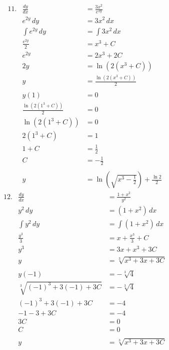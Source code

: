 \documentclass[12pt]{article}
\begin{document}
\begin{multicols*}{2}
    \vspace*{-520pt}
    \begin{align*}
        &11.&\frac{dy}{dx} &= \frac{3x^2}{e^{2y}} \\
        &&e^{2y}\,dy &= 3x^2\,dx \\
        &&\int e^{2y}\,dy &= \int 3x^2\,dx \\
        &&\frac{e^{2y}}{2} &= x^3 + C \\
        &&e^{2y} &= 2x^3 +2C \\
        &&2y &= \ln \left( 2\left(x^3 + C\right) \right) \\
        &&y &= \frac{\ln \left( 2\left(x^3 + C\right) \right)}{2} \\ \\
        &&y(1) &= 0 \\
        &&\frac{\ln \left( 2\left(1^3 + C\right) \right)}{2} &= 0 \\
        &&\ln \left( 2\left(1^3 + C\right) \right) &= 0 \\
        &&2\left(1^3+C\right) &= 1 \\
        &&1+C &= \frac{1}{2} \\
        &&C &= -\frac{1}{2} \\ \\
        &&y &= \ln \left( \sqrt{x^3 - \frac{1}{2}} \right) + \frac{\ln 2}{2} 
    \end{align*}
    \columnbreak
    \begin{align*}
        &12.&\frac{dy}{dx} &= \frac{1 + x^2}{y^2} \\
        &&y^2\,dy &= \left(1+x^2\right)\,dx \\
        &&\int y^2\,dy &= \int \left(1+x^2\right)\,dx \\
        &&\frac{y^3}{3} &= x+\frac{x^3}{3}+C \\
        &&y^3 &= 3x + x^3 + 3C \\ 
        &&y &= \sqrt[3]{x^3+3x+3C} \\ \\
        &&y(-1) &= -\sqrt[3]{4} \\
        &&\sqrt[3]{(-1)^3+3(-1)+3C} &= -\sqrt[3]{4} \\
        &&(-1)^3+3(-1)+3C &= -4 \\
        &&-1-3+3C &= -4 \\
        &&3C &= 0 \\
        &&C &= 0 \\ \\
        &&y &= \sqrt[3]{x^3+3x+3C} 
    \end{align*}
\end{multicols*}



\end{document}
